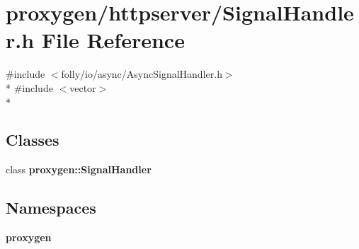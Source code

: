 \section{proxygen/httpserver/\+Signal\+Handler.h File Reference}
\label{SignalHandler_8h}
{\ttfamily \#include $<$folly/io/async/\+Async\+Signal\+Handler.\+h$>$}\\*
{\ttfamily \#include $<$vector$>$}\\*
\subsection*{Classes}
\begin{DoxyCompactItemize}
\item 
class {\bf proxygen\+::\+Signal\+Handler}
\end{DoxyCompactItemize}
\subsection*{Namespaces}
\begin{DoxyCompactItemize}
\item 
 {\bf proxygen}
\end{DoxyCompactItemize}
